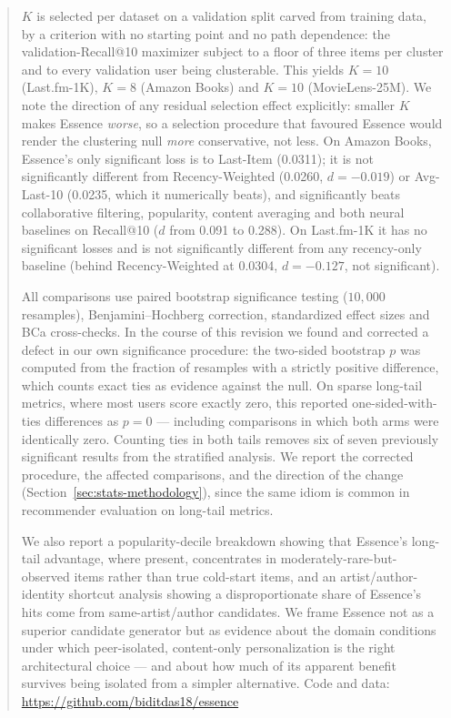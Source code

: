 \documentclass[11pt,a4paper]{article}
\begin{document}
\begin{abstract}
$K$ is selected per dataset on a validation split carved from training data,
by a criterion with no starting point and no path dependence: the
validation-Recall@10 maximizer subject to a floor of three items per cluster
and to every validation user being clusterable. This yields $K=10$
(Last.fm-1K), $K=8$ (Amazon Books) and $K=10$
(MovieLens-25M). We note the direction of any residual selection effect
explicitly: smaller $K$ makes Essence \emph{worse}, so a selection procedure
that favoured Essence would render the clustering null \emph{more}
conservative, not less. On Amazon Books, Essence's only significant loss is to
Last-Item (0.0311); it is not significantly different from
Recency-Weighted (0.0260, $d=-0.019$) or Avg-Last-10 (0.0235,
which it numerically beats), and significantly beats collaborative filtering,
popularity, content averaging and both neural baselines on Recall@10
($d$ from 0.091 to 0.288). On Last.fm-1K it has no significant
losses and is not significantly different from any recency-only baseline
(behind Recency-Weighted at 0.0304, $d=-0.127$, not significant).

All comparisons use paired bootstrap significance testing ($10{,}000$
resamples), Benjamini--Hochberg correction, standardized effect sizes and BCa
cross-checks. In the course of this revision we found and corrected a defect
in our own significance procedure: the two-sided bootstrap $p$ was computed
from the fraction of resamples with a strictly positive difference, which
counts exact ties as evidence against the null. On sparse long-tail metrics,
where most users score exactly zero, this reported one-sided-with-ties
differences as $p=0$ --- including comparisons in which both arms were
identically zero. Counting ties in both tails removes six of seven previously
significant results from the stratified analysis. We report the corrected
procedure, the affected comparisons, and the direction of the change
(Section~\ref{sec:stats-methodology}), since the same idiom is common in
recommender evaluation on long-tail metrics.

We also report a popularity-decile breakdown showing that Essence's long-tail
advantage, where present, concentrates in moderately-rare-but-observed items
rather than true cold-start items, and an artist/author-identity shortcut
analysis showing a disproportionate share of Essence's hits come from
same-artist/author candidates. We frame Essence not as a superior candidate
generator but as evidence about the domain conditions under which
peer-isolated, content-only personalization is the right architectural choice
--- and about how much of its apparent benefit survives being isolated from a
simpler alternative.
Code and data: \url{https://github.com/biditdas18/essence}
\end{abstract}
\end{document}
